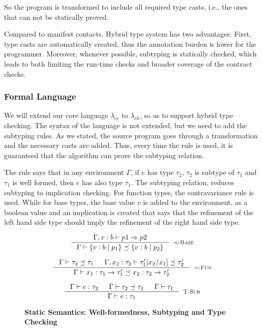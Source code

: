 So the program is transformed to include all required type casts, 
i.e., the ones that can not be statically proved.


Compared to manifest contacts, Hybrid type system has two advantages:
First, type casts are automatically created, thus the annotation burden is lower for
the programmer.
Moreover, whenever possible, subtyping is statically checked, which leads to both
limiting the run-time checks and broader coverage of the contract checks.

\subsubsection{Formal Language}
We will extend our core language $\lambda_{cc}$ to $\lambda_{ch}$,
so as to support hybrid type checking. 
The syntax of the language is not extended, but we need to add the subtyping rules.
As we stated, the source program goes through a transformation and the necessary casts are added.
Thus, every time the \tsub rule is used, it is guaranteed that the algorithm can prove
the subtyping relation.

The rule \tsub says that in any environment $\Gamma$, if $e$ has type $\tau_2$, 
$\tau_2$ is subtype of $\tau_1$ and $\tau_1$ is well formed, then $e$ has also type $\tau_1$.
The subtyping relation, reduces subtyping to implication checking.
For function types, the contravariance rule is used.
While for base types, the base value $v$ is added to the environment, as a boolean value
and an implication is created that says that the refinement of the left hand side type
should imply the refinement of the right hand side type.


\begin{figure}[ht!]
\medskip {}

$$
\inference
   {\Gamma, v:b \vdash  p1 \Rightarrow p2 }
   {\isSubType{\Gamma}{\tref{b}{p_1}}{\tref{b}{p_2}}}
   [\tsubBase]
$$

$$
\inference
   {\isSubType{\Gamma}{\tau_2}{\tau_1} &
	\isSubType{\Gamma, x_2:{\tau_2}}{\SUBST{\tau_1'}{x_1}{x_2}}{\tau_2'}	
   }
   {\isSubType{\Gamma}
	  {\tfun{x_1}{\tau_1}{\tau_1'}}
	  {\tfun{x_2}{\tau_2}{\tau_2'}}
}[\tsubFun]
$$


\medskip {}

$$\begin{array}{cc}

\inference
  {  \hastype{\Gamma}{e}{\tau_2} && \isSubType{\Gamma}{\tau_2}{\tau_1} 
  && \isWellFormed{\Gamma}{\tau_1}
  }
  {\hastype{\Gamma}{e}{\tau_1}}
  [\tsub]
\end{array}$$

\caption{\textbf{Static Semantics: Well-formedness, Subtyping and Type Checking}}
\label{fig:rules}
\end{figure}

 
